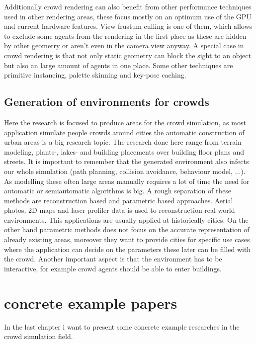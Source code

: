 \documentclass{acmsiggraph}               %
\begin{document}
Additionally crowd rendering can also benefit from other performance techniques used in other rendering areas, these focus mostly on an optimum use of the GPU and current hardware features. View frustum culling is one of them, which allows to exclude some agents from the rendering in the first place as these are hidden by other geometry or aren't even in the camera view anyway. A special case in crowd rendering is that not only static geometry can block the sight to an object but also an large amount of agents in one place. Some other techniques are primitive instancing, palette skinning and key-pose caching.     
\cite{beacco_survey_2016}

\cite{thalmann_crowd_2013}

\subsection{Generation of environments for crowds}

Here the research is focused to produce areas for the crowd simulation, as most application simulate people crowds around cities the automatic construction of urban areas is a big research topic. The research done here range from terrain modeling, plants-, lakes- and building placements over building floor plans and streets. It is important to remember that the generated environment also infects our whole simulation (path planning, collision avoidance, behaviour model, ...). 
As modelling these often large areas manually requires a lot of time the need for automatic or semiautomatic algorithms is big. A rough separation of these methods are reconstruction based and parametric based approaches. 
Aerial photos, 2D maps and laser profiler data is used to reconstruction real world environments. This applications are usually applied at historically cities. 
On the other hand parametric methods does not focus on the accurate representation of already existing areas, moreover they want to provide cities for specific use cases where the application can decide on the parameters these later can be filled with the crowd.  Another important aspect is that the environment has to be interactive, for example  crowd agents should be able to enter buildings.
\cite{thalmann_crowd_2013}

\section{concrete example papers}

In the last chapter i want to present some concrete example researches in the crowd simulation field. 
\end{document}
